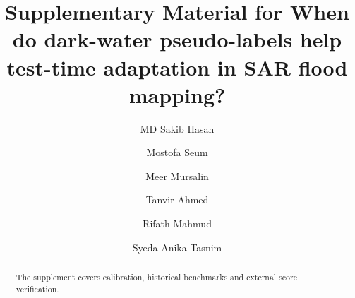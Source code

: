 \documentclass[a4paper,fleqn]{cas-sc}
\begin{document}
\let\WriteBookmarks\relax
\let\printorcid\relax
\def\floatpagepagefraction{1}
\def\textpagefraction{.001}

\title[mode=title]{Supplementary Material for When do dark-water pseudo-labels help test-time adaptation in SAR flood mapping?}
\author[1]{MD Sakib Hasan}
\author[1]{Mostofa Seum}
\author[1]{Meer Mursalin}
\author[1]{Tanvir Ahmed}
\cormark[1]
\author[1]{Rifath Mahmud}
\author[1]{Syeda Anika Tasnim}
\begin{abstract}
The supplement covers calibration, historical benchmarks and external score verification.
\end{abstract}
\maketitle

\renewcommand{\thesection}{S\arabic{section}}
\renewcommand{\thefigure}{S\arabic{figure}}
\renewcommand{\thetable}{S\arabic{table}}
\renewcommand{\theequation}{S\arabic{equation}}




\clearpage


\end{document}

